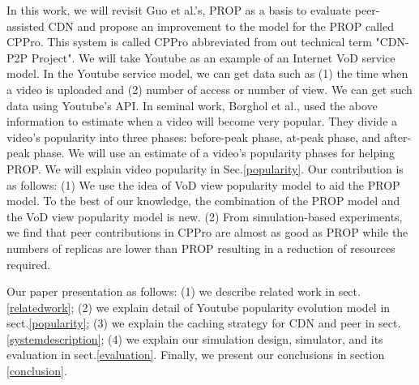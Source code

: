 \documentclass[10pt,final,journal,a4paper]{IEEEtran}
\begin{document}
In this work, we will revisit Guo et al.'s, \cite{1613869} PROP as a basis to evaluate peer-assisted CDN and propose an improvement to the model for the PROP called CPPro.
This system is called CPPro abbreviated from out technical term "CDN-P2P Project".
We will take Youtube as an example of an Internet VoD service model.
In the Youtube service model, we can get data such as (1) the time when a video is uploaded and (2) number of access or number of view.
We can get such data using Youtube's API.
In seminal work, Borghol et al., \cite{Borghol:2011:CMP:2039452.2039717} used the above information to estimate when a video will become very popular.
They divide a video's popularity into three phases: before-peak phase, at-peak phase, and after-peak phase.
We will use an estimate of a video's popularity phases for helping PROP.
We will explain video popularity in Sec.\ref{popularity}.
Our contribution is as follows:
(1) We use the idea of VoD view popularity model to aid the PROP model. 
To the best of our knowledge, the combination of the PROP model and the VoD view popularity model is new.
(2) From simulation-based experiments, we find that peer contributions in CPPro are almost as good as  PROP while the numbers of replicas are lower than PROP resulting in a reduction of resources required.

Our paper presentation as follows: (1) we describe related work in sect.\ref{relatedwork}; (2) we explain detail of Youtube popularity evolution model in sect.\ref{popularity}; (3) we explain the caching strategy for CDN and peer in sect.\ref{systemdescription}; (4) we explain our simulation design, simulator, and its evaluation in sect.\ref{evaluation}.
Finally, we present our conclusions in section \ref{conclusion}.
\end{document}
